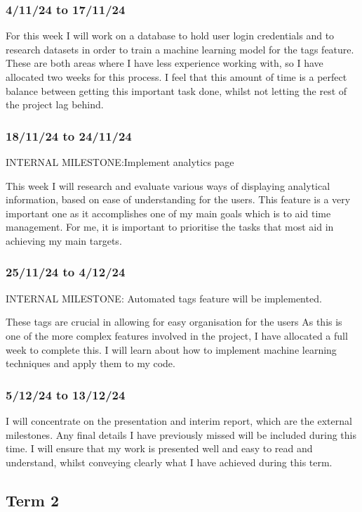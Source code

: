 \documentclass[12pt]{article}
\begin{document}
\subsubsection{4/11/24 to 17/11/24}
For this week I will work on a database to hold user login credentials and to research datasets in order to train a machine learning model for the tags feature. These are both areas where I have less experience working with, so I have allocated two weeks for this process. I feel that this amount of time is a perfect balance between getting this important task done, whilst not letting the rest of the project lag behind.

\subsubsection{18/11/24 to 24/11/24}
INTERNAL MILESTONE:Implement analytics page

This week I will research and evaluate various ways of displaying analytical information, based on ease of understanding for the users. This feature is a very important one as it accomplishes one of my main goals which is to aid time management. For me, it is important to prioritise the tasks that most aid in achieving my main targets.


\subsubsection{25/11/24 to 4/12/24}
INTERNAL MILESTONE: Automated tags feature will be implemented.

These tags are crucial in allowing for easy organisation for the users As this is one of the more complex features involved in the project, I have allocated a full week to complete this. I will learn about how to implement machine learning techniques and apply them to my code.



\subsubsection{5/12/24 to 13/12/24}
I will concentrate on the presentation and interim report, which are the external milestones. Any final details I have previously missed will be included during this time. I will ensure that my work is presented well and easy to read and understand, whilst conveying clearly what I have achieved during this term.  

\subsection{Term 2}
\end{document}
